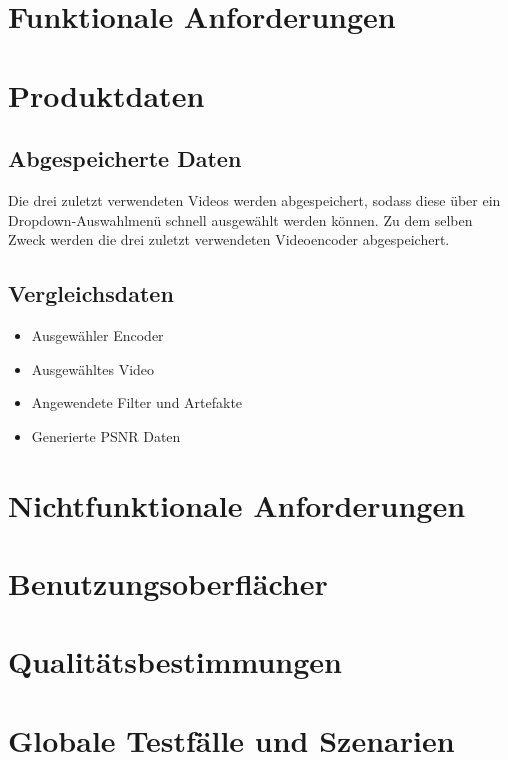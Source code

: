 \documentclass[parskip=full]{scrartcl}
\begin{document}
\section{Funktionale Anforderungen}

\section{Produktdaten}
\subsection{Abgespeicherte Daten}
Die drei zuletzt verwendeten Videos werden abgespeichert, sodass diese über ein Dropdown-Auswahlmenü schnell ausgewählt werden können. Zu dem selben Zweck werden die drei zuletzt verwendeten Videoencoder abgespeichert.
\subsection{Vergleichsdaten}
\begin{itemize}
\item Ausgewähler Encoder
\item Ausgewähltes Video
\item Angewendete Filter und Artefakte
\item Generierte PSNR Daten
\end{itemize}
\section{Nichtfunktionale Anforderungen}

\section{Benutzungsoberflächer}

\section{Qualitätsbestimmungen}

\section{Globale Testfälle und Szenarien}
\end{document}
